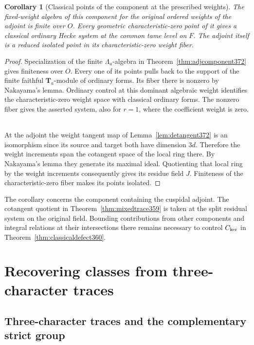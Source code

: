 \documentclass[a4paper,11pt]{article}
\newtheorem{corollary}[proposition]{Corollary}
\theoremstyle{definition}
\theoremstyle{remark}
\numberwithin{equation}{section}
\begin{document}
\begin{corollary}[Classical points of the component at the prescribed weights]
\label{cor:classfiber372}
The fixed-weight algebra of this component for the original
ordered weights of the adjoint is finite over \(O\). Every
geometric characteristic-zero point of it gives a classical
ordinary Hecke system at the common tame level on \(F\).
The adjoint itself is a reduced isolated point in its
characteristic-zero weight fiber.
\end{corollary}
\begin{proof}
Specialization of the finite \(\Lambda_a\)-algebra in
Theorem~\ref{thm:adjcomponent372} gives finiteness over \(O\).
Every one of its points pulls back to the support of the
finite faithful \(\mathbf T_a\)-module of ordinary forms.
Its fiber there is nonzero by Nakayama's lemma. Ordinary
control at this dominant algebraic weight identifies the
characteristic-zero weight space with classical ordinary
forms. The nonzero fiber gives the asserted system, also
for \(r=1\), where the coefficient weight is zero.
~\cite{VII-V-geraghty363}

At the adjoint the weight tangent map of
Lemma~\ref{lem:detangent372} is an isomorphism since its
source and target both have dimension \(3d\). Therefore
the weight increments span the cotangent space of the
local ring there. By Nakayama's lemma they generate its
maximal ideal. Quotienting that local ring by the weight
increments consequently gives its residue field \(J\).
Finiteness of the characteristic-zero fiber makes its
points isolated.
\end{proof}

The corollary concerns the component containing the cuspidal
adjoint. The cotangent quotient in
Theorem~\ref{thm:mixedtrace359} is taken at the split
residual system on the original field. Bounding contributions
from other components and integral relations at their
intersections there remains necessary to control \(C_{\rm ker}\) in
Theorem~\ref{thm:classicaldefect360}.

\section{Recovering classes from three-character traces}\label{nav:chapter-three-character-traces}
\subsection{Three-character traces and the complementary strict group}
\label{sec:traceminors373}
\end{document}
